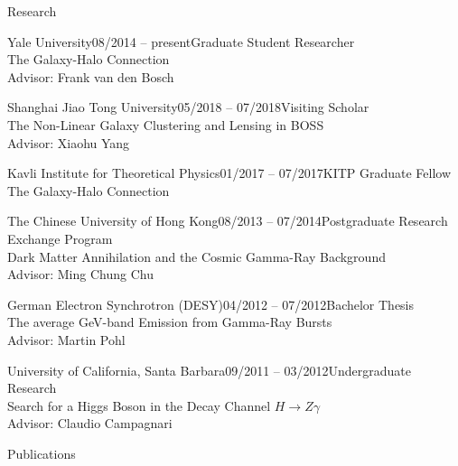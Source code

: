 \documentclass[11pt]{resume} %
\begin{document}
\begin{rSection}{Research}
  \begin{adjustwidth}{0.5cm}{}
    \begin{rSubsection}{Yale University}{08/2014 -- present}{Graduate Student Researcher\\The Galaxy-Halo Connection\\Advisor: Frank van den Bosch}{}\end{rSubsection}
    \begin{rSubsection}{Shanghai Jiao Tong University}{05/2018 -- 07/2018}{Visiting Scholar\\The Non-Linear Galaxy Clustering and Lensing in BOSS\\Advisor: Xiaohu Yang}{}\end{rSubsection}
    \begin{rSubsection}{Kavli Institute for Theoretical Physics}{01/2017 -- 07/2017}{KITP Graduate Fellow\\The Galaxy-Halo Connection}{}\end{rSubsection}
    \begin{rSubsection}{The Chinese University of Hong Kong}{08/2013 -- 07/2014}{Postgraduate Research Exchange Program\\Dark Matter Annihilation and the Cosmic Gamma-Ray Background\\Advisor: Ming Chung Chu}{}\end{rSubsection}
    \begin{rSubsection}{German Electron Synchrotron (DESY)}{04/2012 -- 07/2012}{Bachelor Thesis\\The average GeV-band Emission from Gamma-Ray Bursts\\Advisor: Martin Pohl}{}\end{rSubsection}
    \begin{rSubsection}{University of California, Santa Barbara}{09/2011 -- 03/2012}{Undergraduate Research\\Search for a Higgs Boson in the Decay Channel $H \rightarrow Z\gamma$\\Advisor: Claudio Campagnari}{}\end{rSubsection}
  \end{adjustwidth}
\end{rSection}

\begin{rSection}{Publications}
  \setlength{\leftskip}{0.5cm}
  \nocite{11, 10, 9, 8, 7, 6, 5, 4, 3, 2, 1}
  \printbibliography[heading=none]
\end{rSection}
\end{document}
